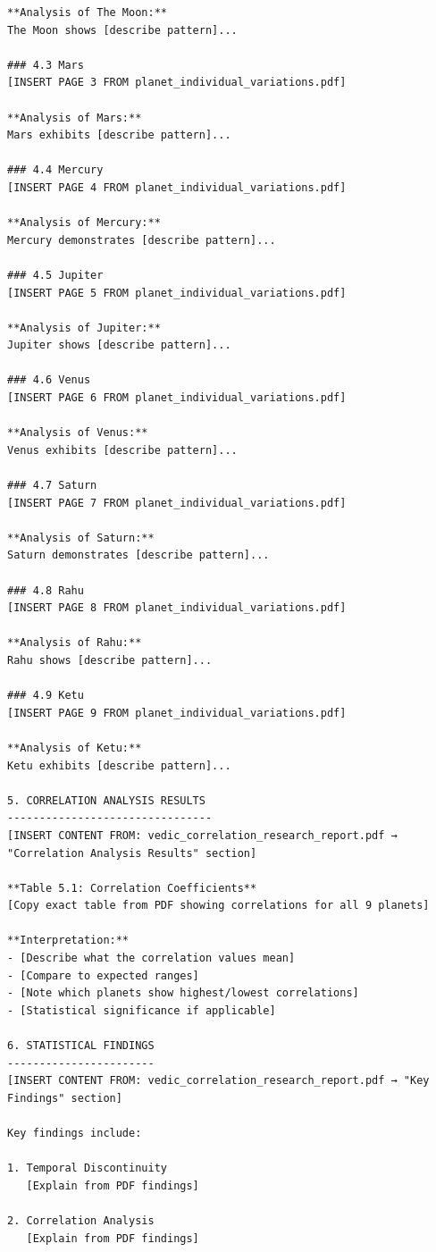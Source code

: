 \documentclass[
  11pt,
  oneside,
  openany]{scrbook}
\begin{document}
\begin{verbatim}
**Analysis of The Moon:**
The Moon shows [describe pattern]...

### 4.3 Mars
[INSERT PAGE 3 FROM planet_individual_variations.pdf]

**Analysis of Mars:**
Mars exhibits [describe pattern]...

### 4.4 Mercury
[INSERT PAGE 4 FROM planet_individual_variations.pdf]

**Analysis of Mercury:**
Mercury demonstrates [describe pattern]...

### 4.5 Jupiter
[INSERT PAGE 5 FROM planet_individual_variations.pdf]

**Analysis of Jupiter:**
Jupiter shows [describe pattern]...

### 4.6 Venus
[INSERT PAGE 6 FROM planet_individual_variations.pdf]

**Analysis of Venus:**
Venus exhibits [describe pattern]...

### 4.7 Saturn
[INSERT PAGE 7 FROM planet_individual_variations.pdf]

**Analysis of Saturn:**
Saturn demonstrates [describe pattern]...

### 4.8 Rahu
[INSERT PAGE 8 FROM planet_individual_variations.pdf]

**Analysis of Rahu:**
Rahu shows [describe pattern]...

### 4.9 Ketu
[INSERT PAGE 9 FROM planet_individual_variations.pdf]

**Analysis of Ketu:**
Ketu exhibits [describe pattern]...

5. CORRELATION ANALYSIS RESULTS
--------------------------------
[INSERT CONTENT FROM: vedic_correlation_research_report.pdf → "Correlation Analysis Results" section]

**Table 5.1: Correlation Coefficients**
[Copy exact table from PDF showing correlations for all 9 planets]

**Interpretation:**
- [Describe what the correlation values mean]
- [Compare to expected ranges]
- [Note which planets show highest/lowest correlations]
- [Statistical significance if applicable]

6. STATISTICAL FINDINGS
-----------------------
[INSERT CONTENT FROM: vedic_correlation_research_report.pdf → "Key Findings" section]

Key findings include:

1. Temporal Discontinuity
   [Explain from PDF findings]

2. Correlation Analysis
   [Explain from PDF findings]


\end{verbatim}
\end{document}
